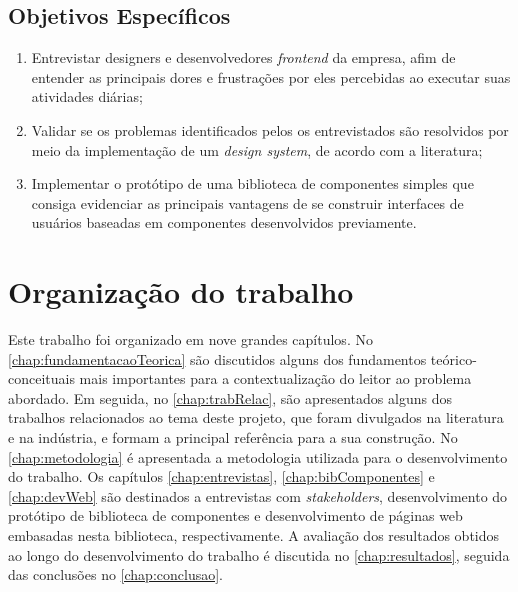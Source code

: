 \subsection{Objetivos Específicos}

\begin{enumerate}
    \item Entrevistar designers e desenvolvedores \textit{frontend} da empresa, afim de entender as principais dores e frustrações por eles percebidas ao executar suas atividades diárias;
    \item Validar se os problemas identificados pelos os entrevistados são resolvidos por meio da implementação de um \textit{design system}, de acordo com a literatura;
    \item Implementar o protótipo de uma biblioteca de componentes simples que consiga evidenciar as principais vantagens de se construir interfaces de usuários baseadas em componentes desenvolvidos previamente.
\end{enumerate}{}

\section{Organização do trabalho}
\label{sec:organizacaoTrabalho}

Este trabalho foi organizado em nove grandes capítulos. No \autoref{chap:fundamentacaoTeorica} são discutidos alguns dos fundamentos teórico-conceituais mais importantes para a contextualização do leitor ao problema abordado. Em seguida, no \autoref{chap:trabRelac}, são apresentados alguns dos trabalhos relacionados ao tema deste projeto, que foram divulgados na literatura e na indústria, e formam a principal referência para a sua construção. No \autoref{chap:metodologia} é apresentada a metodologia utilizada para o desenvolvimento do trabalho. Os capítulos \ref{chap:entrevistas}, \ref{chap:bibComponentes} e \ref{chap:devWeb} são destinados a entrevistas com \textit{stakeholders}, desenvolvimento do protótipo de biblioteca de componentes e desenvolvimento de páginas web embasadas nesta biblioteca, respectivamente. A avaliação dos resultados obtidos ao longo do desenvolvimento do trabalho é discutida no \autoref{chap:resultados}, seguida das conclusões no \autoref{chap:conclusao}.

